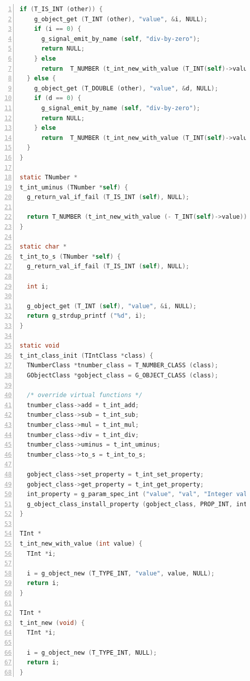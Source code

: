 \begin{lstlisting}[language=C, numbers=left]
  if (T_IS_INT (other)) {
    g_object_get (T_INT (other), "value", &i, NULL);
    if (i == 0) {
      g_signal_emit_by_name (self, "div-by-zero");
      return NULL;
    } else
      return  T_NUMBER (t_int_new_with_value (T_INT(self)->value / i));
  } else {
    g_object_get (T_DOUBLE (other), "value", &d, NULL);
    if (d == 0) {
      g_signal_emit_by_name (self, "div-by-zero");
      return NULL;
    } else
      return  T_NUMBER (t_int_new_with_value (T_INT(self)->value / (int)  d));
  }
}

static TNumber *
t_int_uminus (TNumber *self) {
  g_return_val_if_fail (T_IS_INT (self), NULL);

  return T_NUMBER (t_int_new_with_value (- T_INT(self)->value));
}

static char *
t_int_to_s (TNumber *self) {
  g_return_val_if_fail (T_IS_INT (self), NULL);

  int i;

  g_object_get (T_INT (self), "value", &i, NULL); 
  return g_strdup_printf ("%d", i);
}

static void
t_int_class_init (TIntClass *class) {
  TNumberClass *tnumber_class = T_NUMBER_CLASS (class);
  GObjectClass *gobject_class = G_OBJECT_CLASS (class);

  /* override virtual functions */
  tnumber_class->add = t_int_add;
  tnumber_class->sub = t_int_sub;
  tnumber_class->mul = t_int_mul;
  tnumber_class->div = t_int_div;
  tnumber_class->uminus = t_int_uminus;
  tnumber_class->to_s = t_int_to_s;

  gobject_class->set_property = t_int_set_property;
  gobject_class->get_property = t_int_get_property;
  int_property = g_param_spec_int ("value", "val", "Integer value", G_MININT, G_MAXINT, 0, G_PARAM_READWRITE);
  g_object_class_install_property (gobject_class, PROP_INT, int_property);
}

TInt *
t_int_new_with_value (int value) {
  TInt *i;

  i = g_object_new (T_TYPE_INT, "value", value, NULL);
  return i;
}

TInt *
t_int_new (void) {
  TInt *i;

  i = g_object_new (T_TYPE_INT, NULL);
  return i;
}
\end{lstlisting}

